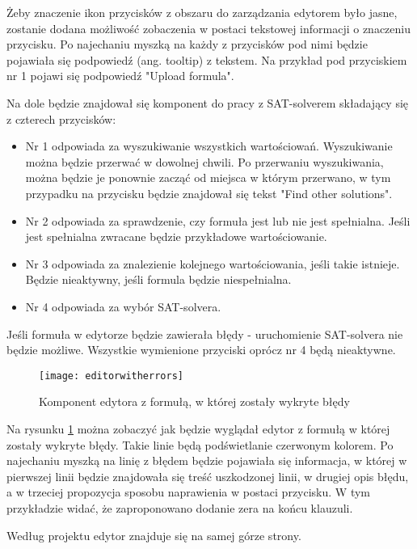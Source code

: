 \documentclass[a4paper,12pt]{book}
\theoremstyle{definition}
\begin{document}
Żeby znaczenie ikon przycisków z obszaru do zarządzania edytorem było jasne, zostanie dodana możliwość zobaczenia w postaci tekstowej informacji o znaczeniu przycisku. Po najechaniu myszką na każdy z przycisków pod nimi będzie pojawiała się podpowiedź (ang. tooltip) z tekstem. Na przykład pod przyciskiem nr 1 pojawi się podpowiedź "Upload formula".

Na dole będzie znajdował się komponent do pracy z SAT-solverem składający się z czterech przycisków: 

\begin{itemize}
    \item Nr 1 odpowiada za wyszukiwanie wszystkich wartościowań. Wyszukiwanie można będzie przerwać w dowolnej chwili. Po przerwaniu wyszukiwania, można będzie je ponownie zacząć od miejsca w którym przerwano, w tym przypadku na przycisku będzie znajdował się tekst "Find other solutions".
    \item Nr 2 odpowiada za sprawdzenie, czy formuła jest lub nie jest spełnialna. Jeśli jest spełnialna zwracane będzie przykładowe wartościowanie.
    \item Nr 3 odpowiada za znalezienie kolejnego wartościowania, jeśli takie istnieje. Będzie nieaktywny, jeśli formula będzie niespełnialna. 
    \item Nr 4 odpowiada za wybór SAT-solvera.
\end{itemize}

Jeśli formuła w edytorze będzie zawierała błędy - uruchomienie SAT-solvera nie będzie możliwe. Wszystkie wymienione przyciski oprócz nr 4 będą nieaktywne.

\begin{figure}[ht]
    \centering
    \texttt{[image: editorwitherrors]}
    \caption{Komponent edytora z formułą, w której zostały wykryte błędy}
    \label{fig:editorwitherrors}
\end{figure}

Na rysunku \ref{fig:editorwitherrors} można zobaczyć jak będzie wyglądał edytor z formułą w której zostały wykryte błędy. Takie linie będą podświetlanie czerwonym kolorem. Po najechaniu myszką na linię z błędem będzie pojawiała się informacja, w której w pierwszej linii będzie znajdowała się treść uszkodzonej linii, w drugiej opis błędu, a w trzeciej propozycja sposobu naprawienia w postaci przycisku. W tym przykładzie widać, że zaproponowano dodanie zera na końcu klauzuli.

Według projektu edytor znajduje się na samej górze strony.
\end{document}
